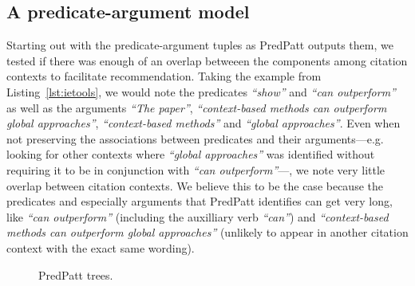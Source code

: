\subsection{A predicate-argument model}
Starting out with the predicate-argument tuples as PredPatt outputs them, we tested if there was enough of an overlap betweeen the components among citation contexts to facilitate recommendation. Taking the example from Listing~\ref{lst:ietools}, we would note the predicates \emph{``show''} and \emph{``can outperform''} as well as the arguments \emph{``The paper''}, \emph{``context-based methods can outperform global approaches''}, \emph{``context-based methods''} and \emph{``global approaches''}. Even when not preserving the associations between predicates and their arguments---e.g. looking for other contexts where \emph{``global approaches''} was identified without requiring it to be in conjunction with \emph{``can outperform''}---, we note very little overlap between citation contexts. We believe this to be the case because the predicates and especially arguments that PredPatt identifies can get very long, like \emph{``can outperform''} (including the auxilliary verb \emph{``can''}) and \emph{``context-based methods can outperform global approaches''} (unlikely to appear in another citation context with the exact same wording).

\begin{figure}
  \centering
  \caption{PredPatt trees.}
  \label{fig:pptrees}
\end{figure}

